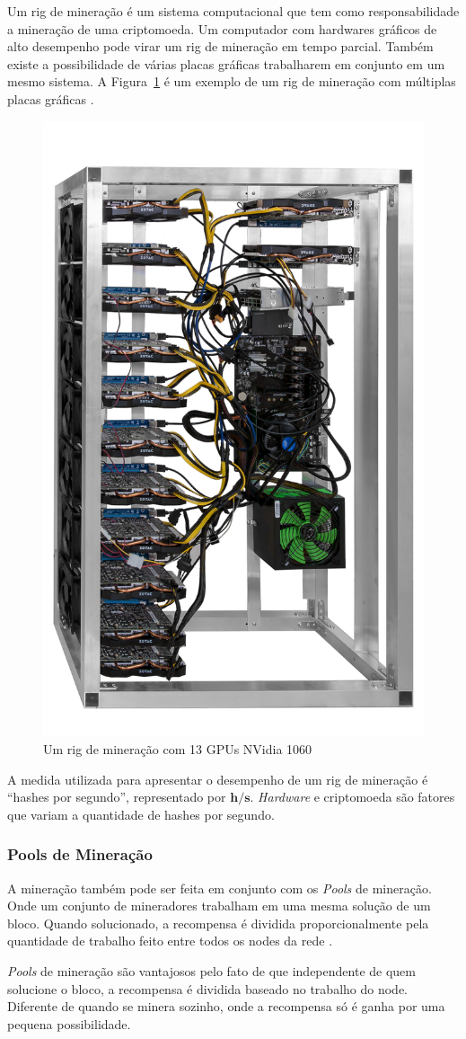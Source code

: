 \documentclass[
article,			%
12pt,				%
openright,			%
oneside,			%
a4paper,			%
chapter=TITLE,		%
section=TITLE,		%
subsection=TITLE,	%
subsubsection=TITLE,%
subsubsubsection=TITLE, %
english,			%
brazil,				%
]{abntex2}
\begin{document}
Um rig de mineração é um sistema computacional que tem como
responsabilidade a mineração de uma criptomoeda. Um computador com
hardwares gráficos de alto desempenho pode virar um rig de mineração
em tempo parcial. Também existe a possibilidade de várias placas
gráficas trabalharem em conjunto em um mesmo sistema. A
Figura~\ref{fig:rig_mineracao} é um exemplo de um rig de mineração com
múltiplas placas gráficas \cite{BitcoinWiki2015}.

\begin{figure}[H]
    \caption{\label{fig:rig_mineracao}Um rig de mineração com 13 GPUs
    NVidia 1060}
    \begin{center}
        \includegraphics[width=.3\linewidth]{rig_mineracao.png}
    \end{center}
\end{figure}

A medida utilizada para apresentar o desempenho de um rig de mineração
é ``hashes por segundo'', representado por $\mathbf{h/s}$.
\emph{Hardware} e criptomoeda são fatores que variam a quantidade de
hashes por segundo.

\subsubsection{Pools de Mineração}

A mineração também pode ser feita em conjunto com os \emph{Pools} de
mineração. Onde um conjunto de mineradores trabalham em uma mesma
solução de um bloco. Quando solucionado, a recompensa é dividida
proporcionalmente pela quantidade de trabalho feito entre todos os
nodes da rede \cite{Weber2012}.

\emph{Pools} de mineração são vantajosos pelo fato de que independente
de quem solucione o bloco, a recompensa é dividida baseado no trabalho
do node. Diferente de quando se minera sozinho, onde a recompensa só é
ganha por uma pequena possibilidade.
\end{document}
